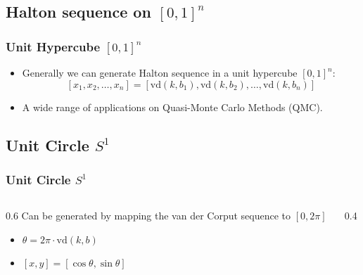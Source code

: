 \documentclass[serif]{beamer} %
\begin{document}
\subsection{Halton sequence on $[0,1]^n$}
\begin{frame}[fragile]
\frametitle{Unit Hypercube $[0,1]^n$}
\begin{itemize}
  \item Generally we can generate Halton sequence in a unit hypercube $[0,1]^n$:
  \[
  [x_1, x_2, \ldots, x_n] = [\mathrm{vd}(k,b_1), \mathrm{vd}(k,b_2), \ldots, \mathrm{vd}(k,b_n)]
  \]
  \item A wide range of applications on Quasi-Monte Carlo Methods (QMC).
\end{itemize}
\end{frame}

\subsection{Unit Circle $S^1$}
\begin{frame}[fragile]
\frametitle{Unit Circle $S^1$}
\begin{columns}
\begin{column}{0.6\textwidth}
  Can be generated by mapping the van der Corput sequence to $ [0, 2\pi]$
  \begin{itemize}
    \item $\theta = 2\pi \cdot \mathrm{vd}(k,b)$
    \item $[x, y] = [\cos\theta, \sin\theta]$
  \end{itemize}
\end{column}
\begin{column}{0.4\textwidth}
\end{column}
\end{columns}
\end{frame}
\end{document}
